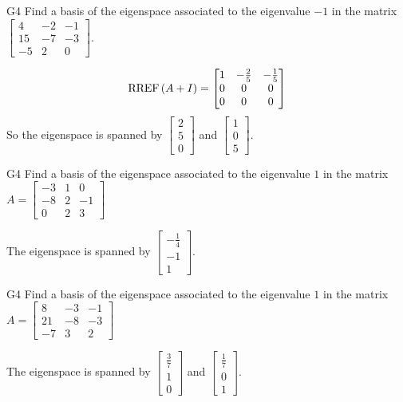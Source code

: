 \begin{problem}{G4}
Find a basis of the eigenspace associated to the eigenvalue $-1$ in the matrix $\begin{bmatrix} 4 & -2 & -1 \\ 15 & -7 & -3 \\ -5 & 2 & 0 \end{bmatrix}$. 
\end{problem}
\begin{solution}
$$\operatorname{RREF}\left(A+I\right) = \begin{bmatrix} 1 & - \frac{2}{5} & -\frac{1}{5} \\ 0 & 0 & 0 \\ 0 & 0 & 0 \end{bmatrix}$$
So the eigenspace is spanned by $\begin{bmatrix} 2 \\5 \\  0 \end{bmatrix}$ and $\begin{bmatrix} 1 \\ 0 \\ 5 \end{bmatrix}$.
\end{solution}

\begin{problem}{G4}
Find a basis of the eigenspace associated to the eigenvalue $1$ in the matrix $A=\begin{bmatrix} -3 & 1 & 0 \\ -8 & 2 & -1 \\ 0 & 2 & 3 \end{bmatrix}$
\end{problem}
\begin{solution}
The eigenspace is spanned by $\begin{bmatrix} -\frac{1}{4} \\ -1 \\ 1 \end{bmatrix}$.
\end{solution}

\begin{problem}{G4}
Find a basis of the eigenspace associated to the eigenvalue $1$ in the matrix $A=\begin{bmatrix} 8 & -3 & -1 \\ 21 & -8 & -3 \\ -7 & 3  & 2 \end{bmatrix}$
\end{problem}
\begin{solution}
The eigenspace is spanned by $\begin{bmatrix} \frac{3}{7} \\ 1 \\ 0 \end{bmatrix}$ and $\begin{bmatrix}\frac{1}{7} \\ 0 \\ 1 \end{bmatrix}$.
\end{solution}

